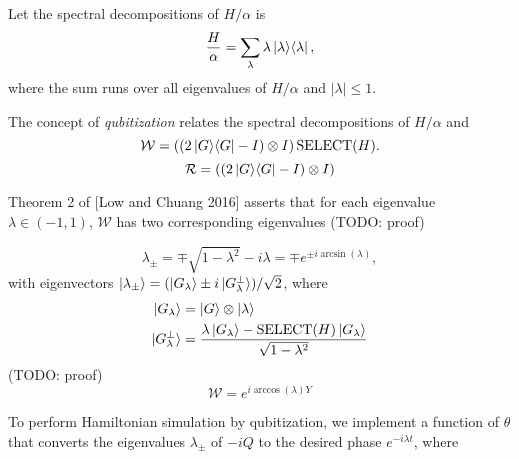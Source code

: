 \documentclass[11pt, oneside]{article}   	%
\begin{document}
Let the spectral decompositions of $H/\alpha$ is
\begin{equation*} 
\frac{H}{\alpha} = \sum_{\lambda} \lambda \ket{\lambda} \! \bra{\lambda},
\end{equation*}
where the sum runs over all eigenvalues of $H/\alpha$ and $|\lambda| \leq 1$.

The concept of \textit{qubitization} relates the spectral decompositions of $H/\alpha$ and 
\begin{equation*} 
\mathcal{W} = \left( (2 \ket{G} \! \bra{G} - I) \otimes I \right) \textrm{SELECT}(H).
\end{equation*}
\begin{equation*} 
\mathcal{R} = \left( (2 \ket{G} \! \bra{G} - I) \otimes I \right)
\end{equation*}

Theorem 2 of [Low and Chuang 2016] asserts that for each eigenvalue $\lambda \in (-1, 1)$, $\mathcal{W}$ has two corresponding eigenvalues (TODO: proof)

\begin{equation*} 
\lambda_{\pm} = \mp \sqrt{1 - \lambda^2} - i \lambda = \mp e^{\pm i \arcsin(\lambda)},
\end{equation*}
with eigenvectors $\ket{\lambda_{\pm}} = (\ket{G_{\lambda}} \pm i \ket{G^{\perp}_{\lambda}})/\sqrt{2}$, where
\begin{align*} 
\ket{G_{\lambda}} &= \ket{G} \otimes \ket{\lambda} \\
\ket{G^{\perp}_{\lambda}} &= \frac{\lambda \ket{G_{\lambda}} - \textrm{SELECT}(H) \ket{G_{\lambda}}}{\sqrt{1 - \lambda^2}}
\end{align*}
(TODO: proof)
\begin{equation*} 
\mathcal{W} = e^{i \arccos(\lambda) Y}
\end{equation*}

To perform Hamiltonian simulation by qubitization, we implement a function of $\theta$ that converts the eigenvalues $\lambda_{\pm}$ of $-iQ$ to the desired phase 
$e^{-i \lambda t}$, where %
\end{document}
